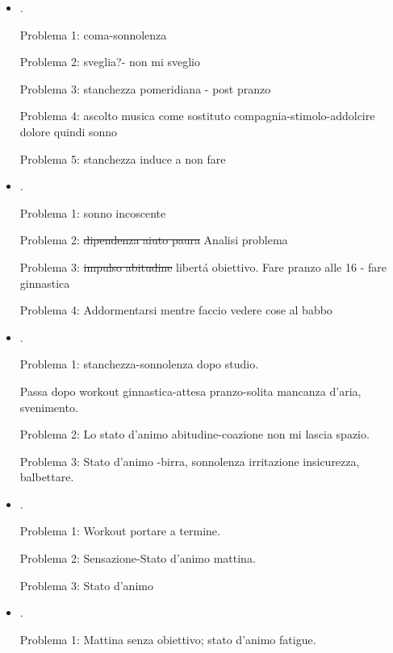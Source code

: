\begin{itemize}
Problema 1: determinazione workout se

Problema 2: mattina demotivata

Problema 3: dopo pranzo non ho tangibile obiettivo

\item {}.

Problema 1: coma-sonnolenza

Problema 2: sveglia?- non mi sveglio

Problema 3: stanchezza pomeridiana - post pranzo

Problema 4: ascolto musica come sostituto compagnia-stimolo-addolcire dolore quindi sonno

Problema 5: stanchezza induce a non fare

\item {}.

Problema 1: sonno incoscente

Problema 2: \sout{dipendenza aiuto paura} Analisi problema

Problema 3: \sout{impulso abitudine} libert\'a obiettivo. Fare pranzo alle 16 - fare ginnastica

Problema 4: Addormentarsi mentre faccio vedere cose al babbo

\item {}.

Problema 1: stanchezza-sonnolenza dopo studio.

Passa dopo workout ginnastica-attesa pranzo-solita mancanza d'aria, svenimento.

Problema 2: Lo stato d'animo abitudine-coazione non mi lascia spazio.

Problema 3: Stato d'animo -birra, sonnolenza irritazione insicurezza, balbettare.

\item {}.

Problema 1: Workout portare a termine.

Problema 2: Sensazione-Stato d'animo mattina.

Problema 3: Stato d'animo 

\item {}.

Problema 1: Mattina senza obiettivo; stato d'animo fatigue.


\end{itemize}
